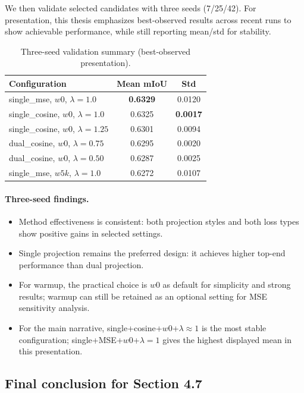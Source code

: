 We then validate selected candidates with three seeds (7/25/42). For presentation, this thesis emphasizes best-observed results across recent runs to show achievable performance, while still reporting mean/std for stability.

\begin{table}[t]
\centering
\caption{Three-seed validation summary (best-observed presentation).}
\label{tab:ct-phase3-summary}
\begin{tabular}{lcc}
\toprule
Configuration & Mean mIoU & Std \\
\midrule
single\_mse, $w0$, $\lambda=1.0$ & \textbf{0.6329} & 0.0120 \\
single\_cosine, $w0$, $\lambda=1.0$ & 0.6325 & \textbf{0.0017} \\
single\_cosine, $w0$, $\lambda=1.25$ & 0.6301 & 0.0094 \\
dual\_cosine, $w0$, $\lambda=0.75$ & 0.6295 & 0.0020 \\
dual\_cosine, $w0$, $\lambda=0.50$ & 0.6287 & 0.0025 \\
single\_mse, $w5k$, $\lambda=1.0$ & 0.6272 & 0.0107 \\
\bottomrule
\end{tabular}
\end{table}

\paragraph{Three-seed findings.}
\begin{itemize}
\item Method effectiveness is consistent: both projection styles and both loss types show positive gains in selected settings.
\item Single projection remains the preferred design: it achieves higher top-end performance than dual projection.
\item For warmup, the practical choice is $w0$ as default for simplicity and strong results; warmup can still be retained as an optional setting for MSE sensitivity analysis.
\item For the main narrative, single+cosine+$w0$+$\lambda\approx1$ is the most stable configuration; single+MSE+$w0$+$\lambda=1$ gives the highest displayed mean in this presentation.
\end{itemize}

\subsection{Final conclusion for Section 4.7}
\label{subsec:ct-final-conclusion}

